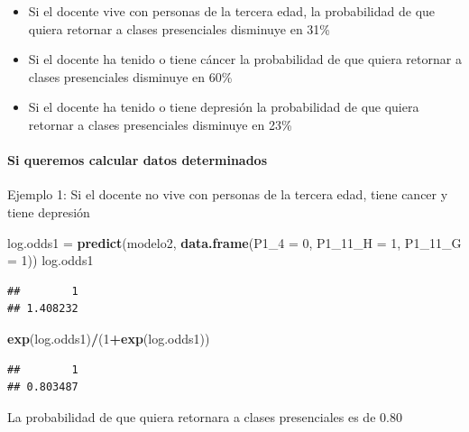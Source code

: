 \documentclass[
]{article}
\newenvironment{Shaded}{\begin{snugshade}}{\end{snugshade}}
\newcommand{\AttributeTok}[1]{\textcolor[rgb]{0.13,0.29,0.53}{#1}}
\newcommand{\DecValTok}[1]{\textcolor[rgb]{0.00,0.00,0.81}{#1}}
\newcommand{\FunctionTok}[1]{\textcolor[rgb]{0.13,0.29,0.53}{\textbf{#1}}}
\newcommand{\NormalTok}[1]{#1}
\newcommand{\OtherTok}[1]{\textcolor[rgb]{0.56,0.35,0.01}{#1}}
\newcommand{\SpecialCharTok}[1]{\textcolor[rgb]{0.81,0.36,0.00}{\textbf{#1}}}
\begin{document}
\begin{itemize}
\item
  Si el docente vive con personas de la tercera edad, la probabilidad de
  que quiera retornar a clases presenciales disminuye en 31\%
\item
  Si el docente ha tenido o tiene cáncer la probabilidad de que quiera
  retornar a clases presenciales disminuye en 60\%
\item
  Si el docente ha tenido o tiene depresión la probabilidad de que
  quiera retornar a clases presenciales disminuye en 23\%
\end{itemize}

\hypertarget{si-queremos-calcular-datos-determinados}{%
\paragraph{Si queremos calcular datos
determinados}\label{si-queremos-calcular-datos-determinados}}

Ejemplo 1: Si el docente no vive con personas de la tercera edad, tiene
cancer y tiene depresión

\begin{Shaded}
\begin{Highlighting}[]
\NormalTok{log.odds1 }\OtherTok{=} \FunctionTok{predict}\NormalTok{(modelo2, }\FunctionTok{data.frame}\NormalTok{(}\AttributeTok{P1\_4 =} \DecValTok{0}\NormalTok{, }\AttributeTok{P1\_11\_H =} \DecValTok{1}\NormalTok{, }\AttributeTok{P1\_11\_G =} \DecValTok{1}\NormalTok{))}
\NormalTok{log.odds1}
\end{Highlighting}
\end{Shaded}

\begin{verbatim}
##        1 
## 1.408232
\end{verbatim}

\begin{Shaded}
\begin{Highlighting}[]
\FunctionTok{exp}\NormalTok{(log.odds1)}\SpecialCharTok{/}\NormalTok{(}\DecValTok{1}\SpecialCharTok{+}\FunctionTok{exp}\NormalTok{(log.odds1))}
\end{Highlighting}
\end{Shaded}

\begin{verbatim}
##        1 
## 0.803487
\end{verbatim}

La probabilidad de que quiera retornara a clases presenciales es de 0.80
\end{document}
